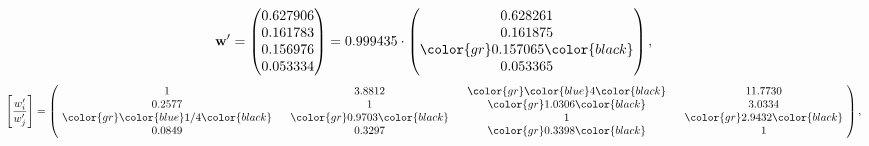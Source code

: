 \begin{example}
\begin{equation*}
\mathbf{w}^{\prime} =
\begin{pmatrix}
0.627906\\
0.161783\\
0.156976\\
0.053334
\end{pmatrix} =
0.999435\cdot
\begin{pmatrix}
0.628261\\
0.161875\\
\color{gr} 0.157065\color{black} \\
0.053365
\end{pmatrix},
\end{equation*}
\begin{equation*}
\left[ \frac{{w}^{\prime}_i}{{w}^{\prime}_j} \right] =
\begin{pmatrix}
$\,\,$ 1 $\,\,$ & $\,\,$3.8812$\,\,$ & $\,\,$\color{gr} \color{blue} 4\color{black} $\,\,$ & $\,\,$11.7730$\,\,$ \\
$\,\,$0.2577$\,\,$ & $\,\,$ 1 $\,\,$ & $\,\,$\color{gr} 1.0306\color{black} $\,\,$ & $\,\,$3.0334  $\,\,$ \\
$\,\,$\color{gr} \color{blue}  1/4\color{black} $\,\,$ & $\,\,$\color{gr} 0.9703\color{black} $\,\,$ & $\,\,$ 1 $\,\,$ & $\,\,$\color{gr} 2.9432\color{black}  $\,\,$ \\
$\,\,$0.0849$\,\,$ & $\,\,$0.3297$\,\,$ & $\,\,$\color{gr} 0.3398\color{black} $\,\,$ & $\,\,$ 1  $\,\,$ \\
\end{pmatrix},
\end{equation*}
\end{example}
\newpage
